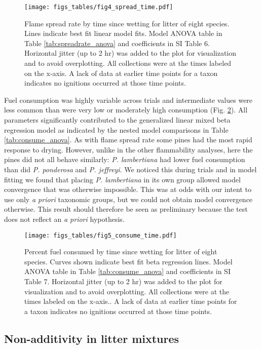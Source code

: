 \documentclass[letterpaper,12pt]{article}
\begin{document}
\begin{figure}[h]
  \centering
\texttt{[image: figs\_tables/fig4\_spread\_time.pdf]}
\caption{Flame spread rate by time since wetting for litter of eight species.
  Lines indicate best fit linear model fits. Model ANOVA table in Table
  \ref{tab:spreadrate_anova} and coefficients in SI Table 6. Horizontal jitter
  (up to 2 hr) was added to the plot for visualization and to avoid
  overplotting. All collections were at the times labeled on the x-axis. A lack
  of data at earlier time points for a taxon indicates no ignitions occurred at
  those time points.}
\label{fig:spread_time}
\end{figure}

Fuel consumption was highly variable across trials and intermediate values were
less common than were very low or moderately high consumption (Fig.
\ref{fig:consume_time}). All parameters significantly contributed to the
generalized linear mixed beta regression model as indicated by the nested model
comparisons in Table \ref{tab:consume_anova}. As with flame spread rate
some pines had the most rapid response to drying. However, unlike in the other
flammability analyses, here the pines did not all behave similarly: \emph{P.
  lambertiana} had lower fuel consumption than did \emph{P. ponderosa} and
\emph{P. jeffreyi}. We noticed this during trials and in model fitting we
found that placing \emph{P. lambertiana} in its own group allowed model
convergence that was otherwise impossible. This was at odds with our intent to
use only \emph{a priori} taxonomic groups, but we could not obtain model
convergence otherwise. This result should therefore be seen as preliminary
because the test does not reflect an \emph{a priori} hypothesis.


\begin{figure}[h]
  \centering
\texttt{[image: figs\_tables/fig5\_consume\_time.pdf]}
\caption{Percent fuel consumed by time since wetting for litter of eight
  species. Curves shown indicate best fit beta regression lines. Model ANOVA
  table in Table \ref{tab:consume_anova} and coefficients in SI Table 7.
  Horizontal jitter (up to 2 hr) was added to the plot for visualization and to
  avoid overplotting. All collections were at the times labeled on the x-axis..
  A lack of data at earlier time points for a taxon indicates no ignitions
  occurred at those time points.}
  \label{fig:consume_time}
\end{figure}


\subsection*{Non-additivity in  litter mixtures}
\end{document}
